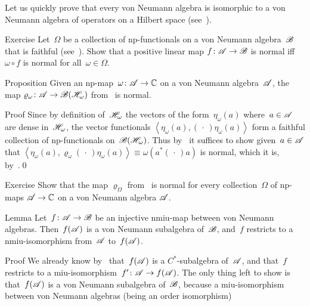 \documentclass[a]{subfiles}
\begin{document}
\begin{parsec}%
\begin{point}%
Let us quickly prove that every von Neumann algebra
is isomorphic to a von Neumann algebra of operators on a 
Hilbert space (see~).
\end{point}
\begin{point}{Exercise}%
Let~$\Omega$ be a collection of np-functionals
on a von Neumann algebra~$\mathscr{B}$
that is faithful (see~).
Show that a positive linear map $f\colon \mathscr{A}\to\mathscr{B}$
is normal iff~$\omega\circ f$
is normal for all~$\omega\in\Omega$.
\end{point}
\begin{point}{Proposition}%
Given an np-map~$\omega\colon \mathscr{A} \to \mathbb{C}$
on a von Neumann algebra~$\mathscr{A}$,
the map $\varrho_\omega\colon \mathscr{A}\to\mathscr{B}(\mathscr{H}_\omega)$
from~ is normal.
\begin{point}{Proof}%
Since by definition of~$\mathscr{H}_\omega$
the vectors of the form~$\eta_\omega(a)$
where~$a\in\mathscr{A}$
are dense in~$\mathscr{H}_\omega$,
the vector functionals
$\left<\eta_\omega(a),(\,\cdot\,)\eta_\omega(a)\right>$
form a faithful collection
of np-functionals on~$\mathscr{B}(\mathscr{H}_\omega)$.
Thus by~
it suffices to show given~$a\in\mathscr{A}$
that $\left<\eta_\omega(a),\varrho_\omega(\,\cdot\,)
\eta_\omega(a)\right>\equiv \omega(a^*(\,\cdot\,)a)$ is normal,
which it is, by~.\qed
\end{point}
\end{point}
\begin{point}{Exercise}%
Show that the map $\varrho_\Omega$ 
from~
is normal for every collection~$\Omega$ of np-maps $\mathscr{A}\to\mathbb{C}$
on a von Neumann algebra $\mathscr{A}$.
\end{point}
\begin{point}{Lemma}%
Let~$f\colon \mathscr{A}\to\mathscr{B}$ be an injective nmiu-map
between von Neumann algebras.
Then~$f(\mathscr{A})$ is a von Neumann subalgebra of~$\mathscr{B}$,
and~$f$ restricts to a nmiu-isomorphism from~$\mathscr{A}$
to~$f(\mathscr{A})$.
\begin{point}{Proof}%
We already know by~
that~$f(\mathscr{A})$ is a $C^*$-subalgebra of~$\mathscr{A}$,
and that~$f$ restricts to a miu-isomorphism~$f'\colon \mathscr{A}\to f(\mathscr{A})$.
The only thing left to show is that~$f(\mathscr{A})$
is a von Neumann subalgebra of~$\mathscr{B}$,
because a miu-isomorphism between von Neumann algebras
(being an order isomorphism)

\end{point}
\end{point}
\end{parsec}
\end{document}
